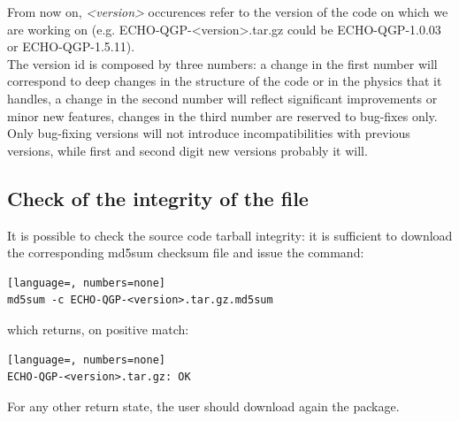 From now on, \emph{<version>} occurences refer to the version of the code on which we are working on (e.g. ECHO-QGP-<version>.tar.gz could be ECHO-QGP-1.0.03 or ECHO-QGP-1.5.11).\\

The version id is composed by three numbers: a change in the first number will correspond to deep changes in the structure of the code or in the physics that it handles, a change in the second number will reflect significant improvements or minor new features, changes in the third number are reserved to bug-fixes only.\\
Only bug-fixing versions will not introduce incompatibilities with previous versions, while first and second digit new versions probably it will.\\

\subsection{Check of the integrity of the file}
It is possible to check the source code tarball integrity: it is sufficient to download the corresponding md5sum checksum file and issue the command:
\begin{lstlisting}[language=, numbers=none]
md5sum -c ECHO-QGP-<version>.tar.gz.md5sum
\end{lstlisting}
which returns, on positive match:
\begin{lstlisting}[language=, numbers=none]
ECHO-QGP-<version>.tar.gz: OK
\end{lstlisting}
For any other return state, the user should download again the package.\\

